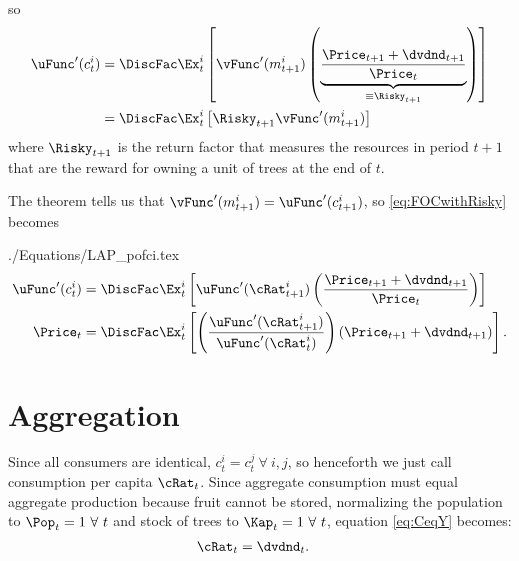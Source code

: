 \documentclass{handout}
\begin{document}
so\hypertarget{FOCwithRisky}{}
\begin{equation}\begin{gathered}\begin{aligned}
 \uFunc^{\prime}(c_{t}^{i}) & =  \DiscFac \Ex_{t}^{i}\left[\vFunc^{\prime}({m}_{t+1}^{i})\left(\underbrace{\frac{{\Price}_{t+1}+\dvdnd_{t+1}}{\Price_{t}}}_{\equiv \Risky_{t+1}}\right)\right] \label{eq:FOCwithRisky}
\\  & =  \DiscFac \Ex_{t}^{i}\left[\Risky_{t+1} \vFunc^{\prime}({m}_{t+1}^{i})\right] 
\end{aligned}\end{gathered}\end{equation}
where $\Risky_{t+1}$ is the return factor that measures the resources in period $t+1$ that are the reward for 
owning a unit of trees at the end of $t$.

The  theorem tells us that  \hypertarget{pofci}{}
$\vFunc^{\prime}({m}_{t+1}^{i})=\uFunc^{\prime}(c_{t+1}^{i})$, so \eqref{eq:FOCwithRisky} becomes
\begin{verbatimwrite}{./Equations/LAP_pofci.tex}
\begin{equation}\begin{gathered}\begin{aligned}
\uFunc^{\prime}(c_{t}^{i}) & =  \DiscFac \Ex_{t}^{i}\left[\uFunc^{\prime}(\cRat_{t+1}^{i})\left(\frac{{\Price}_{t+1}+\dvdnd_{t+1}}{\Price_{t}}\right)\right]  
\\ \Price_{t} & =  \DiscFac \Ex_{t}^{i}
\left[
  \left(
    \frac{\uFunc^{\prime}(\cRat_{t+1}^{i})}{\uFunc^{\prime}(\cRat_{t}^{i})}
  \right)
  \left({\Price}_{t+1}+\dvdnd_{t+1}\right) \label{eq:pofci}
\right] .
\end{aligned}\end{gathered}\end{equation}
\end{verbatimwrite}



\section{Aggregation}

Since all consumers are identical, $c_{t}^{i} = c_{t}^{j}~\forall~i,j$, so henceforth we just call consumption per capita $\cRat_{t}$.  Since aggregate consumption must equal aggregate production because fruit cannot be stored, normalizing the population to $\Pop_{t}=1 ~\forall ~ t$ and stock of trees to $\Kap_{t}=1 ~\forall~t$, equation \eqref{eq:CeqY} becomes:
\begin{equation}\begin{gathered}\begin{aligned}
\cRat_{t} & =  \dvdnd_{t}.
\end{aligned}\end{gathered}\end{equation}
\end{document}
